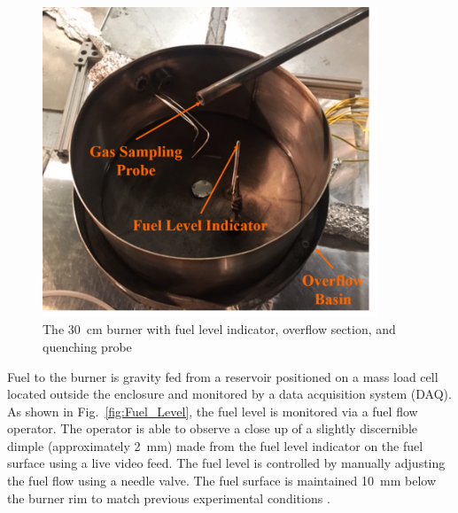 \documentclass[12pt]{article}
\begin{document}
\begin{figure}[h!]
	\centering
\includegraphics[width=10.0cm,keepaspectratio]{Pool_Burner.png}
	\caption[Photograph of the burner]{The 30~cm burner with fuel level indicator, overflow section, and quenching probe}
	\label{fig:Pool Burner}
\end{figure}

Fuel to the burner is gravity fed from a reservoir positioned on a mass load cell located outside the enclosure and monitored by a data acquisition system (DAQ). As shown in Fig.~\ref{fig:Fuel_Level}, the fuel level is monitored via a fuel flow operator. The operator is able to observe a close up of a slightly discernible dimple (approximately \SI{2}{mm}) made from the fuel level indicator on the fuel surface using a live video feed. The fuel level is controlled by manually adjusting the fuel flow using a needle valve. The fuel surface is maintained \SI{10}{mm} below the burner rim to match previous experimental conditions \cite{Fisher1987,Hamins2016,Kim2019,Weckman1996}.
\end{document}
